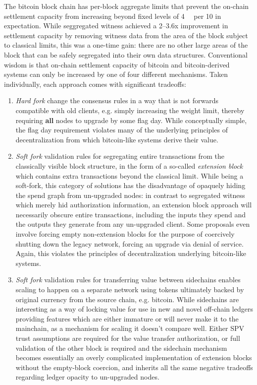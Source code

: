 The bitcoin block chain has per-block aggregate limits that prevent
the on-chain settlement capacity from increasing beyond fixed levels
of \SI{4}{\mega\weight} per \SI{10}{\min} in expectation.  While
seggregated witness achieved a \numrange{2}{3.6}x improvement in
settlement capacity by removing witness data from the area of the
block subject to classical limits, this was a one-time gain: there are
no other large areas of the block that can be safely segregated into
their own data structures.  Conventional wisdom is that on-chain
settlement capacity of bitcoin and bitcoin-derived systems can only be
increased by one of four different mechanisms.  Taken individually,
each approach comes with significant tradeoffs:

\begin{enumerate}
  \item
    \emph{Hard fork} change the consensus rules in a way that is not
    forwards compatible with old clients, e.g. simply increasing the
    weight limit, thereby requiring \textbf{all} nodes to upgrade by
    some flag day.  While conceptually simple, the flag day
    requirement violates many of the underlying principles of
    decentralization from which bitcoin-like systems derive their
    value.

  \item
    \emph{Soft fork} validation rules for segregating entire
    transactions from the classically visible block structure, in the
    form of a so-called \emph{extension block} which contains extra
    transactions beyond the classical limit.  While being a soft-fork,
    this category of solutions has the disadvantage of opaquely hiding
    the spend graph from un-upgraded nodes: in contrast to segregated
    witness which merely hid authorization information, an extension
    block approach will necessarily obscure entire transactions,
    including the inputs they spend and the outputs they generate from
    any un-upgraded client.  Some proposals even involve forcing empty
    non-extension blocks for the purpose of coercively shutting down
    the legacy network, forcing an upgrade via denial of service.
    Again, this violates the principles of decentralization underlying
    bitcoin-like systems.

  \item
    \emph{Soft fork} validation rules for transferring value between
    sidechains enables scaling to happen on a separate network using
    tokens ultimately backed by original currency from the source
    chain, e.g. bitcoin.  While sidechains are interesting as a way of
    locking value for use in new and novel off-chain ledgers providing
    features which are either immature or will never make it to the
    mainchain, as a mechanism for scaling it doesn't compare well.
    Either SPV trust assumptions are required for the value transfer
    authorization, or full validation of the other block is required
    and the sidechain mechanism becomes essentially an overly
    complicated implementation of extension blocks without the
    empty-block coercion, and inherits all the same negative tradeoffs
    regarding ledger opacity to un-upgraded nodes.


\end{enumerate}
